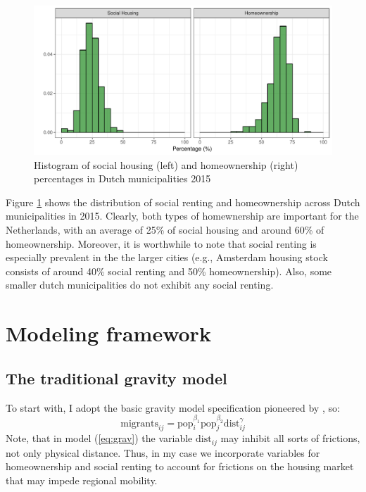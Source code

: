 \documentclass[fleqn,10pt]{SelfArx} %
\begin{document}
        \begin{figure}[ht]\centering %
          \includegraphics[width=0.8\linewidth]{../fig/hist_housing.pdf}
          \caption{Histogram of social housing (left) and
            homeownership (right) percentages in Dutch municipalities
            2015}
            \label{fig:housing_mig}
        \end{figure}

        Figure \ref{fig:housing_mig} shows the distribution of social
        renting and homeownership across Dutch municipalities in 2015.
        Clearly, both types of homewnership are important for the
        Netherlands, with an average of 25\% of social housing and
        around 60\% of homeownership. Moreover, it is worthwhile to
        note that social renting is especially prevalent in the the
        larger cities (e.g., Amsterdam housing stock consists of around 40\% social renting
        and 50\% homeownership). Also, some smaller dutch municipalities do not exhibit
        any social renting.
        
        \section{Modeling framework}

        \subsection{The traditional gravity model}

        To start with, I adopt the basic gravity model specification pioneered by
        \citet{tinbergen1962shaping}, so:
        \begin{equation}
          \text{migrants}_{ij} = \text{pop}_i^{\beta_1}\text{pop}_j^{\beta_2}\text{dist}_{ij}^\gamma
          \label{eq:grav}
        \end{equation}
        Note, that in model (\ref{eq:grav}) the variable
        $\text{dist}_{ij}$ may inhibit all sorts of frictions, not
        only physical distance. Thus, in my case we incorporate
        variables for homeownership and social renting to account for
        frictions on the housing market that may impede regional
        mobility.
\end{document}
